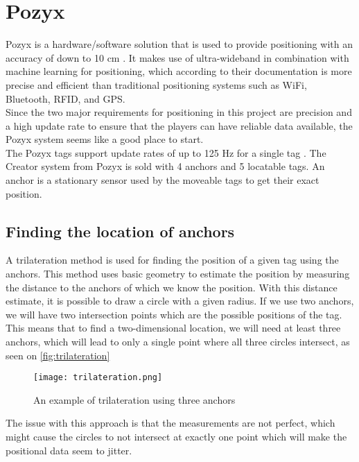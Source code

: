 \section{Pozyx}
Pozyx is a hardware/software solution that is used to provide positioning with an accuracy of down to 10 cm \cite{pozyx}.
It makes use of ultra-wideband in combination with machine learning for positioning, which according to their documentation is more precise and efficient than traditional positioning systems such as WiFi, Bluetooth, RFID, and GPS.
\\
Since the two major requirements for positioning in this project are precision and a high update rate to ensure that the players can have reliable data available, the Pozyx system seems like a good place to start.
\\
The Pozyx tags support update rates of up to 125 Hz for a single tag \cite{pozyx}.
The Creator system from Pozyx is sold with 4 anchors and 5 locatable tags.
An anchor is a stationary sensor used by the moveable tags to get their exact position.
\subsection{Finding the location of anchors}
A trilateration method is used for finding the position of a given tag using the anchors.
This method uses basic geometry to estimate the position by measuring the distance to the anchors of which we know the position.
With this distance estimate, it is possible to draw a circle with a given radius.
If we use two anchors, we will have two intersection points which are the possible positions of the tag.
This means that to find a two-dimensional location, we will need at least three anchors, which will lead to only a single point where all three circles intersect, as seen on \autoref{fig:trilateration}

\begin{figure}[H]
    \centering
    \texttt{[image: trilateration.png]}
    \caption{An example of trilateration using three anchors}
    \label{fig:trilateration}
\end{figure}

The issue with this approach is that the measurements are not perfect, which might cause the circles to not intersect at exactly one point which will make the positional data seem to jitter.

